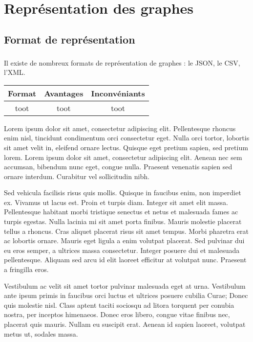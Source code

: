 \chapter{Représentation des graphes}
\section{Format de représentation}
  \paragraph{}
  Il existe de nombreux formats de représentation de graphes : le JSON, le CSV, l'XML.
  
  \begin{table}
   \begin{tabular}{|c|c|c|}
    \hline
    Format & Avantages & Inconvéniants \\
    \hline
    \hline
    toot & toot & toot \\
    \hline
   \end{tabular}

  \end{table}
  

Lorem ipsum dolor sit amet, consectetur adipiscing elit. Pellentesque rhoncus enim nisl, tincidunt condimentum orci consectetur eget. Nulla orci tortor, lobortis sit amet velit in, eleifend ornare lectus. Quisque eget pretium sapien, sed pretium lorem. Lorem ipsum dolor sit amet, consectetur adipiscing elit. Aenean nec sem accumsan, bibendum nunc eget, congue nulla. Praesent venenatis sapien sed ornare interdum. Curabitur vel sollicitudin nibh.

Sed vehicula facilisis risus quis mollis. Quisque in faucibus enim, non imperdiet ex. Vivamus ut lacus est. Proin et turpis diam. Integer sit amet elit massa. Pellentesque habitant morbi tristique senectus et netus et malesuada fames ac turpis egestas. Nulla lacinia mi sit amet porta finibus. Mauris molestie placerat tellus a rhoncus. Cras aliquet placerat risus sit amet tempus. Morbi pharetra erat ac lobortis ornare. Mauris eget ligula a enim volutpat placerat. Sed pulvinar dui eu eros semper, a ultrices massa consectetur. Integer posuere dui et malesuada pellentesque. Aliquam sed arcu id elit laoreet efficitur at volutpat nunc. Praesent a fringilla eros.

Vestibulum ac velit sit amet tortor pulvinar malesuada eget at urna. Vestibulum ante ipsum primis in faucibus orci luctus et ultrices posuere cubilia Curae; Donec quis molestie nisl. Class aptent taciti sociosqu ad litora torquent per conubia nostra, per inceptos himenaeos. Donec eros libero, congue vitae finibus nec, placerat quis mauris. Nullam eu suscipit erat. Aenean id sapien laoreet, volutpat metus ut, sodales massa.

